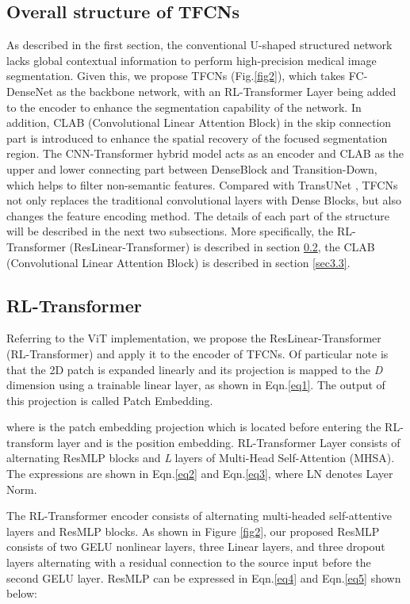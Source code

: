 \documentclass[runningheads]{llncs}
\begin{document}
\subsection{Overall structure of TFCNs}
\label{sec3.1}
As described in the first section, the conventional U-shaped structured network lacks global contextual information to perform high-precision medical image segmentation. Given this, we propose TFCNs (Fig.\ref{fig2}), which takes FC-DenseNet \cite{zhang2018automatic} as the backbone network, with an RL-Transformer Layer being added to the encoder to enhance the segmentation capability of the network. In addition, CLAB (Convolutional Linear Attention Block) in the skip connection part is introduced to enhance the spatial recovery of the focused segmentation region. The CNN-Transformer hybrid model acts as an encoder and CLAB as the upper and lower connecting part between DenseBlock and Transition-Down, which helps to filter non-semantic features. Compared with TransUNet \cite{chen2021transunet}, TFCNs not only replaces the traditional convolutional layers with Dense Blocks, but also changes the feature encoding method. The details of each part of the structure will be described in the next two subsections. More specifically, the RL-Transformer (ResLinear-Transformer) is described in section \ref{sec3.2}, the CLAB (Convolutional Linear Attention Block) is described in section \ref{sec3.3}.

\subsection{RL-Transformer}
\label{sec3.2}
Referring to the ViT \cite{dosovitskiy2020image} implementation, we propose the ResLinear-Transformer (RL-Transformer) and apply it to the encoder of TFCNs. Of particular note is that the 2D patch  is expanded linearly and its projection is mapped to the \emph{D} dimension using a trainable linear layer, as shown in Eqn.\ref{eq1}. The output of this projection is called Patch Embedding.

where  is the patch embedding projection which is located before entering the RL-transform layer and  is the position embedding. RL-Transformer Layer consists of alternating ResMLP blocks and \emph{L} layers of Multi-Head Self-Attention (MHSA). The expressions are shown in Eqn.\ref{eq2} and Eqn.\ref{eq3}, where LN denotes Layer Norm.



The RL-Transformer encoder consists of alternating multi-headed self-attentive layers and ResMLP blocks. As shown in Figure \ref{fig2}, our proposed ResMLP consists of two GELU \cite{hendrycks2016gaussian} nonlinear layers, three Linear layers, and three dropout layers alternating with a residual connection to the source input before the second GELU \cite{hendrycks2016gaussian} layer. ResMLP can be expressed in Eqn.\ref{eq4} and Eqn.\ref{eq5} shown below:
\end{document}
